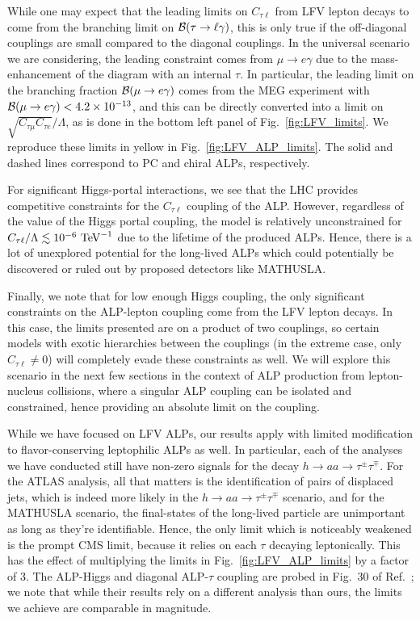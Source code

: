  While one may expect that the leading limits on $C_{\tau \ell}$ from LFV lepton decays to come from the branching limit on ${\cal B}(\tau\rightarrow \ell\gamma)$, this is only true if the off-diagonal couplings are small compared to the diagonal couplings. In the universal scenario we are considering, the leading constraint comes from $\mu \rightarrow e\gamma$ due to the mass-enhancement of the diagram with an internal $\tau$. In particular, the leading limit on the branching fraction ${\cal B}(\mu \rightarrow e\gamma)$ comes from the MEG experiment with ${\cal B}(\mu \rightarrow e\gamma) < 4.2\times10^{-13}$, and this can be directly converted into a limit on $\sqrt{C_{\tau\mu}C_{\tau e}}/\Lambda$, as is done in the bottom left panel of Fig.~\ref{fig:LFV_limits}. We reproduce these limits in yellow in Fig.~\ref{fig:LFV_ALP_limits}. The solid and dashed lines correspond to PC and chiral ALPs, respectively.

For significant Higgs-portal interactions, we see that the LHC provides competitive constraints for the $C_{\tau \ell}$ coupling of the ALP. However, regardless of the value of the Higgs portal coupling, the model is relatively unconstrained for $C_{\tau\ell}/\Lambda \lesssim 10^{-6}~{\rm TeV}^{-1}$ due to the lifetime of the produced ALPs. Hence, there is a lot of unexplored potential for the long-lived ALPs which could potentially be discovered or ruled out by proposed detectors like MATHUSLA. 

Finally, we note that for low enough Higgs coupling, the only significant constraints on the ALP-lepton coupling come from the LFV lepton decays. In this case, the limits presented are on a product of two couplings, so certain models with exotic hierarchies between the couplings (in the extreme case, only $C_{\tau \ell} \neq 0$) will completely evade these constraints as well. We will explore this scenario in the next few sections in the context of ALP production from lepton-nucleus collisions, where a singular ALP coupling can be isolated and constrained, hence providing an absolute limit on the coupling. 

While we have focused on LFV ALPs, our results apply with limited modification to flavor-conserving leptophilic ALPs as well. In particular, each of the analyses we have conducted still have non-zero signals for the decay $h\rightarrow aa \rightarrow \tau^\pm \tau^\mp$. For the ATLAS analysis, all that matters is the identification of pairs of displaced jets, which is indeed more likely in the $h\rightarrow aa\rightarrow \tau^\pm\tau^\mp$ scenario, and for the MATHUSLA scenario, the final-states of the long-lived particle are unimportant as long as they're identifiable. Hence, the only limit which is noticeably weakened is the prompt CMS limit, because it relies on each $\tau$ decaying leptonically. This has the effect of multiplying the limits in Fig.~\ref{fig:LFV_ALP_limits} by a factor of $3$. The ALP-Higgs and diagonal ALP-$\tau$ coupling are probed in Fig.~30 of Ref.~\cite{Bauer:2017ris}; we note that while their results rely on a different analysis than ours, the limits we achieve are comparable in magnitude.


